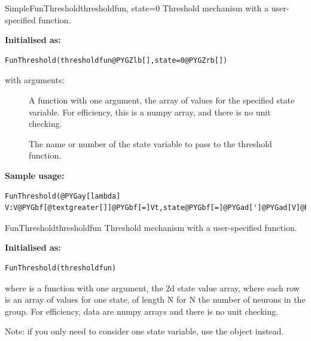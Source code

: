 \documentclass[letterpaper,10pt,english]{manual}
\begin{document}
\hypertarget{brian.SimpleFunThreshold}{}\begin{classdesc}{SimpleFunThreshold}{thresholdfun, state=0}
Threshold mechanism with a user-specified function.

\textbf{Initialised as:}

\begin{Verbatim}[commandchars=@\[\]]
FunThreshold(thresholdfun@PYGZlb[],state=0@PYGZrb[])
\end{Verbatim}

with arguments:
\begin{description}
\item[]
A function with one argument, the array of values for
the specified state variable. For efficiency, this is
a numpy array, and there is no unit checking.

\item[]
The name or number of the state variable to pass to
the threshold function.

\end{description}

\textbf{Sample usage:}

\begin{Verbatim}[commandchars=@\[\]]
FunThreshold(@PYGay[lambda] V:V@PYGbf[@textgreater[]]@PYGbf[=]Vt,state@PYGbf[=]@PYGad[']@PYGad[V]@PYGad['])
\end{Verbatim}
\end{classdesc}

\hypertarget{brian.FunThreshold}{}\begin{classdesc}{FunThreshold}{thresholdfun}
Threshold mechanism with a user-specified function.

\textbf{Initialised as:}

\begin{Verbatim}[commandchars=@\[\]]
FunThreshold(thresholdfun)
\end{Verbatim}

where  is a function with one argument,
the 2d state value array, where each row is an array of
values for one state, of length N for N the number of
neurons in the group. For efficiency, data are numpy
arrays and there is no unit checking.

Note: if you only need to consider one state variable,
use the \hyperlink{brian.SimpleFunThreshold}{} object instead.
\end{classdesc}
\end{document}
